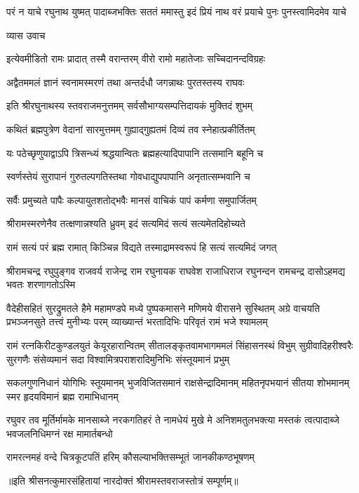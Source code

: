 \fourlineindentedshloka
{परं न याचे रघुनाथ युष्मत्}
{पादाब्जभक्तिः सततं ममास्तु}
{इदं प्रियं नाथ वरं प्रयाचे}
{पुनः पुनस्त्वामिदमेव याचे}%

व्यास उवाच

\twolineshloka
{इत्येवमीडितो रामः प्रादात् तस्मै वरान्तरम्}
{वीरो रामो महातेजाः सच्चिदानन्दविग्रहः}%

\twolineshloka
{अद्वैतममलं ज्ञानं स्वनामस्मरणं तथा}
{अन्तर्दधौ जगन्नाथः पुरतस्तस्य राघवः}%

\twolineshloka
{इति श्रीरघुनाथस्य स्तवराजमनुत्तमम्}
{सर्वसौभाग्यसम्पत्तिदायकं मुक्तिदं शुभम्}%

\twolineshloka
{कथितं ब्रह्मपुत्रेण वेदानां सारमुत्तमम्}
{गुह्याद्गुह्यतमं दिव्यं तव स्नेहात्प्रकीर्तितम्}%

\twolineshloka
{यः पठेच्छृणुयाद्वाऽपि त्रिसन्ध्यं श्रद्धयान्वितः}
{ब्रह्महत्यादिपापानि तत्समानि बहूनि च}%

\twolineshloka
{स्वर्णस्तेयं सुरापानं गुरुतल्पगतिस्तथा}
{गोवधाद्युपपापानि अनृतात्सम्भवानि च}%

\twolineshloka
{सर्वैः प्रमुच्यते पापैः कल्पायुतशतोद्भवैः}
{मानसं वाचिकं पापं कर्मणा समुपार्जितम्}%

\twolineshloka
{श्रीरामस्मरणेनैव तत्क्षणान्नश्यति ध्रुवम्}
{इदं सत्यमिदं सत्यं सत्यमेतदिहोच्यते}%

\twolineshloka
{रामं सत्यं परं ब्रह्म रामात् किञ्चिन्न विद्यते}
{तस्माद्रामस्वरूपं हि सत्यं सत्यमिदं जगत्}%

\fourlineindentedshloka
{श्रीरामचन्द्र रघुपुङ्गव राजवर्य} 
{राजेन्द्र राम रघुनायक राघवेश}
{राजाधिराज रघुनन्दन रामचन्द्र}
{दासोऽहमद्य भवतः शरणागतोऽस्मि}%

\fourlineindentedshloka
{वैदेहीसहितं सुरद्रुमतले हैमे महामण्डपे}
{मध्ये पुष्पकमासने मणिमये वीरासने सुस्थितम्}
{अग्रे वाचयति प्रभञ्जनसुते तत्त्वं मुनीभ्यः परम्}
{व्याख्यान्तं भरतादिभिः परिवृतं रामं भजे श्यामलम्}%

\fourlineindentedshloka
{रामं रत्नकिरीटकुण्डलयुतं केयूरहारान्वितम्} 
{सीतालङ्कृतवामभागममलं सिंहासनस्थं विभुम्} 
{सुग्रीवादिहरीश्वरैः सुरगणैः संसेव्यमानं सदा}
{विश्वामित्रपराशरादिमुनिभिः संस्तूयमानं प्रभुम्}%

\fourlineindentedshloka
{सकलगुणनिधानं योगिभिः स्तूयमानम्} 
{भुजविजितसमानं राक्षसेन्द्रादिमानम्} 
{महितनृपभयानं सीतया शोभमानम्}
{स्मर हृदयविमानं ब्रह्म रामाभिधानम्}%

\fourlineindentedshloka
{रघुवर तव मूर्तिर्मामके मानसाब्जे} 
{नरकगतिहरं ते नामधेयं मुखे मे}
{अनिशमतुलभक्त्या मस्तकं त्वत्पादाब्जे}
{भवजलनिधिमग्नं रक्ष मामार्तबन्धो}%

\twolineshloka
{रामरत्नमहं वन्दे चित्रकूटपतिं हरिम्}
{कौसल्याभक्तिसम्भूतं जानकीकण्ठभूषणम्}%

॥इति श्रीसनत्कुमारसंहितायां नारदोक्तं श्रीरामस्तवराजस्तोत्रं सम्पूर्णम्॥